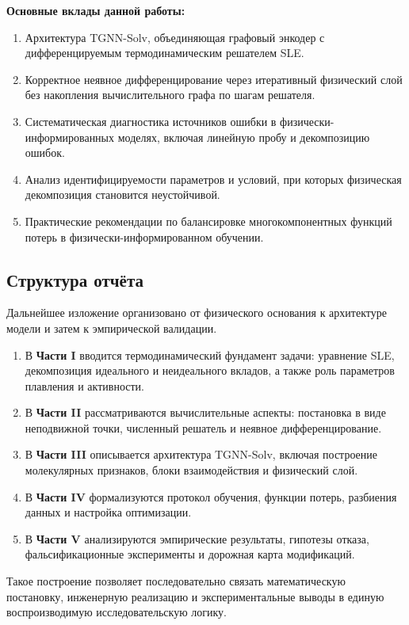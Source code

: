 \documentclass[11pt]{article}
\begin{document}
\textbf{Основные вклады данной работы:}
\begin{enumerate}
  \item Архитектура TGNN-Solv, объединяющая графовый энкодер с дифференцируемым термодинамическим решателем SLE.
  \item Корректное неявное дифференцирование через итеративный физический слой без накопления вычислительного графа по шагам решателя.
  \item Систематическая диагностика источников ошибки в физически-информированных моделях, включая линейную пробу и декомпозицию ошибок.
  \item Анализ идентифицируемости параметров и условий, при которых физическая декомпозиция становится неустойчивой.
  \item Практические рекомендации по балансировке многокомпонентных функций потерь в физически-информированном обучении.
\end{enumerate}

\subsection{Структура отчёта}

Дальнейшее изложение организовано от физического основания к архитектуре модели и затем к эмпирической валидации.

\begin{enumerate}
  \item В \textbf{Части I} вводится термодинамический фундамент задачи: уравнение SLE, декомпозиция идеального и неидеального вкладов, а также роль параметров плавления и активности.
  \item В \textbf{Части II} рассматриваются вычислительные аспекты: постановка в виде неподвижной точки, численный решатель и неявное дифференцирование.
  \item В \textbf{Части III} описывается архитектура TGNN-Solv, включая построение молекулярных признаков, блоки взаимодействия и физический слой.
  \item В \textbf{Части IV} формализуются протокол обучения, функции потерь, разбиения данных и настройка оптимизации.
  \item В \textbf{Части V} анализируются эмпирические результаты, гипотезы отказа, фальсификационные эксперименты и дорожная карта модификаций.
\end{enumerate}

Такое построение позволяет последовательно связать математическую постановку, инженерную реализацию и экспериментальные выводы в единую воспроизводимую исследовательскую логику.
\end{document}
